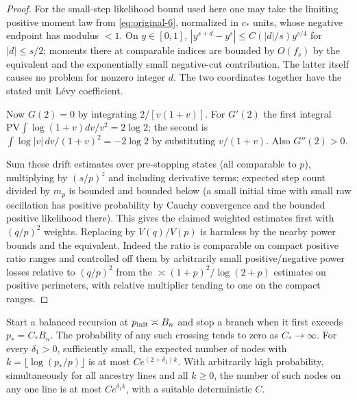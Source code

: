 \begin{proof}
For the small-step likelihood bound used here one may
take the limiting positive moment law from \eqref{eq:original-6}, normalized in \(c_*\)
units, whose negative endpoint has modulus \(<1\). On \(y\in[0,1]\),
\(|y^{s+d}-y^s|\le C (|d|/s)y^{s/4}\) for \(|d|\le s/2\); moments there at comparable
indices are bounded by \(O(f_s)\) by the equivalent and the exponentially small
negative-cut contribution. The latter itself causes no problem for nonzero integer \(d\).
The two coordinates together have the stated unit Lévy coefficient. 

Now \(G(2)=0\) by
integrating \(2/[v(1+v)]\). For \(G'(2)\) the first integral
\(\mathrm{PV}\int \log(1+v)dv/v^2=2\log2\); the second is
\(\int \log|v|\,dv/(1+v)^2=-2\log2\) by substituting \(v/(1+v)\). Also \(G''(2)>0\). 

Sum
these drift estimates over pre-stopping states (all comparable to \(p\)), multiplying by
\((s/p)^z\) and including derivative terms; expected step count divided by \(m_p\) is
bounded and bounded below (a small initial time with small raw oscillation has positive
probability by Cauchy convergence and the bounded positive likelihood there). This gives
the claimed weighted estimates first with \((q/p)^2\) weights. Replacing by \(V(q)/V(p)\)
is harmless by the nearby power bounds and the equivalent. Indeed the ratio is comparable
on compact positive ratio ranges and controlled off them by arbitrarily small
positive/negative power losses relative to \((q/p)^2\) from the
\(\asymp (1+p)^2/\log(2+p)\) estimates on positive perimeters, with relative multiplier
tending to one on the compact ranges.

\end{proof}

\begin{proposition}\label{end:band-counts}
Start a balanced recursion at $p_{\rm init}\asymp B_n$ and stop a branch when it
first exceeds $p_*=C_*B_n$. The probability of any such crossing tends to zero
as $C_*\to\infty$. For every $\delta_1>0$, sufficiently small, the expected
number of nodes with $k=\lfloor\log(p_*/p)\rfloor$ is at most
$C e^{(2+\delta_1)k}$. With arbitrarily high probability, simultaneously for all
ancestry lines and all $k\ge0$, the number of such nodes on any one line is at
most $C e^{\delta_1k}$, with a suitable deterministic $C$.
\end{proposition}

